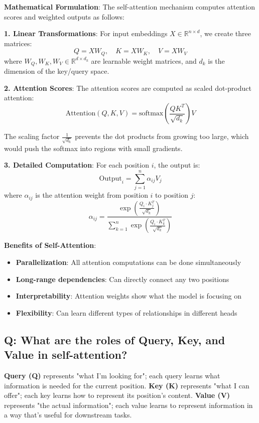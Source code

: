 \textbf{Mathematical Formulation}:
The self-attention mechanism computes attention scores and weighted outputs as follows:

\textbf{1. Linear Transformations}:
For input embeddings \(X \in \mathbb{R}^{n \times d}\), we create three matrices:
\[
	Q = XW_Q, \quad K = XW_K, \quad V = XW_V
\]
where \(W_Q, W_K, W_V \in \mathbb{R}^{d \times d_k}\) are learnable weight matrices, and \(d_k\) is the dimension of the key/query space.

\textbf{2. Attention Scores}:
The attention scores are computed as scaled dot-product attention:
\[
	\text{Attention}(Q, K, V) = \text{softmax}\left(\frac{QK^T}{\sqrt{d_k}}\right)V
\]

The scaling factor \(\frac{1}{\sqrt{d_k}}\) prevents the dot products from growing too large, which would push the softmax into regions with small gradients.

\textbf{3. Detailed Computation}:
For each position \(i\), the output is:
\[
	\text{Output}_i = \sum_{j=1}^{n} \alpha_{ij} V_j
\]
where \(\alpha_{ij}\) is the attention weight from position \(i\) to position \(j\):
\[
	\alpha_{ij} = \frac{\exp\left(\frac{Q_i \cdot K_j^T}{\sqrt{d_k}}\right)}{\sum_{k=1}^{n} \exp\left(\frac{Q_i \cdot K_k^T}{\sqrt{d_k}}\right)}
\]

\textbf{Benefits of Self-Attention}:
\begin{itemize}
	\item \textbf{Parallelization}: All attention computations can be done simultaneously
	\item \textbf{Long-range dependencies}: Can directly connect any two positions
	\item \textbf{Interpretability}: Attention weights show what the model is focusing on
	\item \textbf{Flexibility}: Can learn different types of relationships in different heads
\end{itemize}

\subsection*{Q: What are the roles of Query, Key, and Value in self-attention?}

\textbf{Query (Q)} represents "what I'm looking for"; each query learns what information is needed for the current position.
\textbf{Key (K)} represents "what I can offer"; each key learns how to represent its position's content.
\textbf{Value (V)} represents "the actual information"; each value learns to represent information in a way that's useful for downstream tasks.

